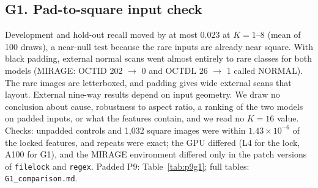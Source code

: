 \subsection*{G1. Pad-to-square input check}
\begin{table}[!htbp]
\caption{Post hoc sensitivity check outside A2 A-11 (rule committed 16 Nov 2026, computed 18 Nov 2026); it never replaces a locked result. MIRAGE and Inception-v3 re-extracted with every image padded with black to a square around its centre, then given each model's own locked transform; scored with the locked episodes and nine-way roster. Size-only: the locked size-only reference (no model; the same for both arms). Nine-way destinations: scans called NORMAL / CNV, DME or DRUSEN / any rare class; R1 rows give the same for the disease images of the same sources (published labels), as the R1 rule requires beside every false-rare count.}
\label{tab:g1}
\centering\footnotesize

\end{table}
Development and hold-out recall moved by at most 0.023 at $K=1$--8 (mean of 100 draws), a near-null test because the rare inputs are already near square. With black padding, external normal scans went almost entirely to rare classes for both models (MIRAGE: OCTID 202 $\to$ 0 and OCTDL 26 $\to$ 1 called NORMAL). The rare images are letterboxed, and padding gives wide external scans that layout. External nine-way results depend on input geometry. We draw no conclusion about cause, robustness to aspect ratio, a ranking of the two models on padded inputs, or what the features contain, and we read no $K=16$ value. Checks: unpadded controls and 1,032 square images were within $1.43\times10^{-6}$ of the locked features, and repeats were exact; the GPU differed (L4 for the lock, A100 for G1), and the MIRAGE environment differed only in the patch versions of \texttt{filelock} and \texttt{regex}. Padded P9: Table~\ref{tab:p9g1}; full tables: \texttt{G1\_comparison.md}.

